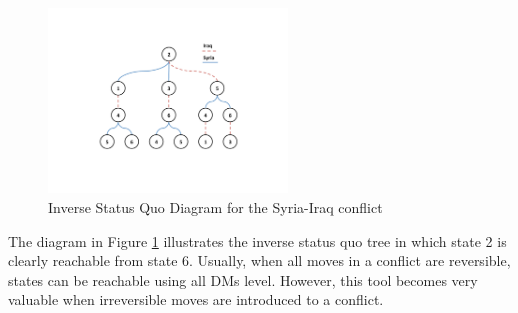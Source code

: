 \documentclass[letterpaper,12pt,titlepage,oneside,final]{book}
\begin{document}
\begin{center}
\begin{figure}
\centering
\includegraphics[width=2.5in]{PDF-IMG/graphsq.pdf}

\caption{Inverse Status Quo Diagram for the Syria-Iraq conflict}

\label{fig:graphsq}
\end{figure}
\end{center}

The diagram in Figure \ref{fig:graphsq} illustrates the inverse status quo tree in which state 2 is clearly reachable from state 6. Usually, when all moves in a conflict are reversible, states can be reachable using all DMs level. However, this tool becomes very valuable when irreversible moves are introduced to a conflict. 



%


%
\end{document}
